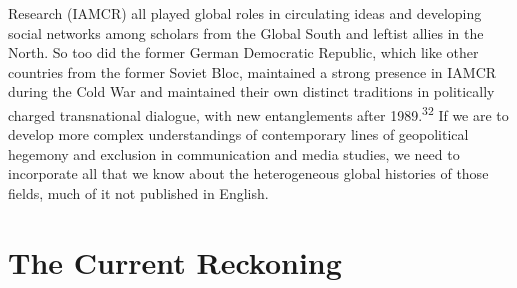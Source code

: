 \documentclass{tufte-handout}
\begin{document}
Research (IAMCR) all played global roles in circulating ideas and
developing social networks among scholars from the Global South and
leftist allies in the North. So too did the former German Democratic
Republic, which like other countries from the former Soviet Bloc,
maintained a strong presence in IAMCR during the Cold War and maintained
their own distinct traditions in politically charged transnational
dialogue, with new entanglements after 1989.\textsuperscript{32} If we are to develop
more complex understandings of contemporary lines of geopolitical
hegemony and exclusion in communication and media studies, we need to
incorporate all that we know about the heterogeneous global histories of
those fields, much of it not published in English.

\hypertarget{the-current-reckoning}{%
\section{\texorpdfstring{The Current Reckoning
}{The Current Reckoning }}\label{the-current-reckoning}}
\end{document}
